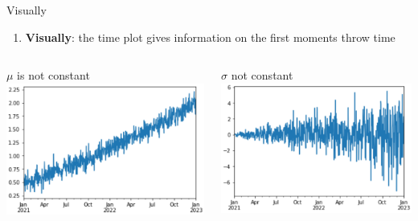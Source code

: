 \documentclass{beamer}
\begin{document}
\begin{frame}{Visually}
\begin{enumerate}
    \item \textbf{Visually}: the time plot gives information on the first moments throw time
\end{enumerate}
\medskip
\begin{columns}
    \begin{column}{.33\textwidth}
    \centering
    $\mu$ is not constant
    \includegraphics[width=\textwidth]{static/course_2_img/drift.PNG}           
    
    \end{column}
    
    \begin{column}{.33\textwidth}
    \centering
    $\sigma$ not constant
    \includegraphics[width=\textwidth]{static/course_2_img/increasing_vol.PNG}        
    \end{column}
    

\end{columns}
\end{frame}
\end{document}
